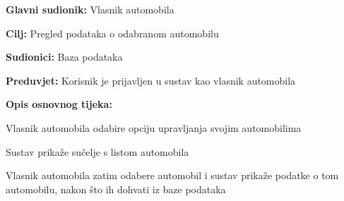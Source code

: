 \noindent {}
\begin{packed_item}
	
	\item \textbf{Glavni sudionik: } Vlasnik automobila
	\item  \textbf{Cilj:} Pregled podataka o odabranom automobilu
	\item  \textbf{Sudionici:} Baza podataka
	\item  \textbf{Preduvjet:} Korisnik je prijavljen u sustav kao vlasnik automobila
	\item  \textbf{Opis osnovnog tijeka:}
	
	\item[] \begin{packed_enum}
		
		\item Vlasnik automobila odabire opciju upravljanja svojim automobilima
		\item Sustav prikaže sučelje s listom automobila
		\item Vlasnik automobila zatim odabere automobil i sustav prikaže podatke o tom
		automobilu, nakon što ih dohvati iz baze podataka
		
	\end{packed_enum}
\end{packed_item}

